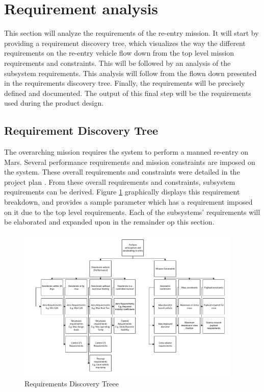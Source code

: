 \section{Requirement analysis} \label{ch:req}
This section will analyze the requirements of the re-entry mission. It will start by providing a requirement discovery tree, which visualizes the way the different requirements on the re-entry vehicle flow down from the top level mission requirements and constraints. This will be followed by an analysis of the subsystem requirements. This analysis will follow from the flown down presented in the requirements discovery tree. Finally, the requirements will be precisely defined and documented. The output of this final step will be the requirements used during the product design. %

\subsection{Requirement Discovery Tree}
The overarching mission requires the system to perform a manned re-entry on Mars. Several performance requirements and mission constraints are imposed on the system. These overall requirements and constraints were detailed in the project plan \cite{Balasooriyan2015}. From these overall requirements and constraints, subsystem requirements can be derived. Figure \ref{fig:RBS} graphically displays this requirement breakdown, and provides a sample parameter which has a requirement imposed on it due to the top level requirements. Each of the subsystems' requirements will be elaborated and expanded upon in the remainder op this section. 

\begin{figure}[h]
\centering
\includegraphics[width=0.95\textwidth]{Figure/RBS.pdf}
\caption{Requirements Discovery Treee} \label{fig:RBS}
\end{figure}










